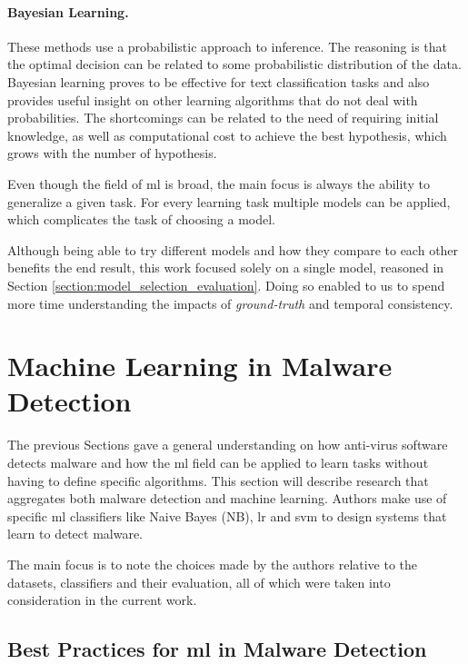 \paragraph{Bayesian Learning.~\cite{mitchell:ml}} These methods use a probabilistic approach to inference.
The reasoning is that the optimal decision can be related to some probabilistic distribution of the data.
Bayesian learning proves to be effective for text classification tasks and also provides useful insight on other learning algorithms that do not deal with probabilities.
The shortcomings can be related to the need of requiring initial knowledge, as well as computational cost to achieve the best hypothesis, which grows with the number of hypothesis.

\medskip

Even though the field of \gls{ml} is broad, the main focus is always the ability to generalize a given task.
For every learning task multiple models can be applied, which complicates the task of choosing a model.

Although being able to try different models and how they compare to each other benefits the end result, this work focused solely on a single model, reasoned in Section \ref{section:model_selection_evaluation}.
Doing so enabled to us to spend more time understanding the impacts of \textit{ground-truth} and temporal consistency.

\section{Machine Learning in Malware Detection}
\label{section:ml_md}

The previous Sections gave a general understanding on how anti-virus software detects malware and how the \gls{ml} field can be applied to learn tasks without having to define specific algorithms.
This section will describe research that aggregates both malware detection and machine learning.
Authors make use of specific \gls{ml} classifiers like Naive Bayes (NB), \gls{lr} and \gls{svm} to design systems that learn to detect malware.

The main focus is to note the choices made by the authors relative to the datasets, classifiers and their evaluation, all of which were taken into consideration in the current work.

\subsection{Best Practices for \gls{ml} in Malware Detection}

